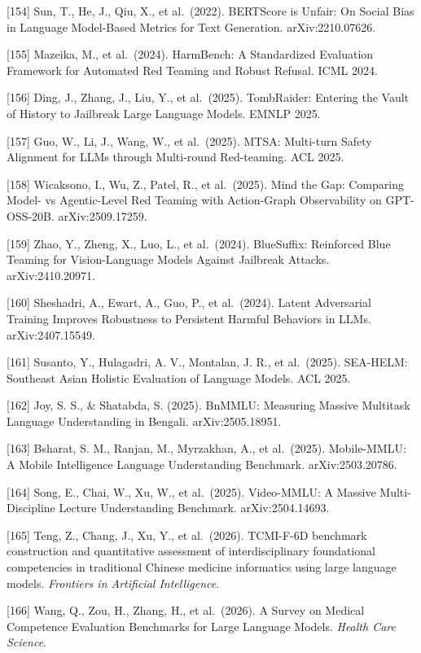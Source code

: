 {[}154{]} Sun, T., He, J., Qiu, X., et al.~(2022). BERTScore is Unfair: On Social Bias in Language Model-Based Metrics for Text Generation. arXiv:2210.07626.

{[}155{]} Mazeika, M., et al.~(2024). HarmBench: A Standardized Evaluation Framework for Automated Red Teaming and Robust Refusal. ICML 2024.

{[}156{]} Ding, J., Zhang, J., Liu, Y., et al.~(2025). TombRaider: Entering the Vault of History to Jailbreak Large Language Models. EMNLP 2025.

{[}157{]} Guo, W., Li, J., Wang, W., et al.~(2025). MTSA: Multi-turn Safety Alignment for LLMs through Multi-round Red-teaming. ACL 2025.

{[}158{]} Wicaksono, I., Wu, Z., Patel, R., et al.~(2025). Mind the Gap: Comparing Model- vs Agentic-Level Red Teaming with Action-Graph Observability on GPT-OSS-20B. arXiv:2509.17259.

{[}159{]} Zhao, Y., Zheng, X., Luo, L., et al.~(2024). BlueSuffix: Reinforced Blue Teaming for Vision-Language Models Against Jailbreak Attacks. arXiv:2410.20971.

{[}160{]} Sheshadri, A., Ewart, A., Guo, P., et al.~(2024). Latent Adversarial Training Improves Robustness to Persistent Harmful Behaviors in LLMs. arXiv:2407.15549.

{[}161{]} Susanto, Y., Hulagadri, A. V., Montalan, J. R., et al.~(2025). SEA-HELM: Southeast Asian Holistic Evaluation of Language Models. ACL 2025.

{[}162{]} Joy, S. S., \& Shatabda, S. (2025). BnMMLU: Measuring Massive Multitask Language Understanding in Bengali. arXiv:2505.18951.

{[}163{]} Bsharat, S. M., Ranjan, M., Myrzakhan, A., et al.~(2025). Mobile-MMLU: A Mobile Intelligence Language Understanding Benchmark. arXiv:2503.20786.

{[}164{]} Song, E., Chai, W., Xu, W., et al.~(2025). Video-MMLU: A Massive Multi-Discipline Lecture Understanding Benchmark. arXiv:2504.14693.

{[}165{]} Teng, Z., Chang, J., Xu, Y., et al.~(2026). TCMI-F-6D benchmark construction and quantitative assessment of interdisciplinary foundational competencies in traditional Chinese medicine informatics using large language models. \emph{Frontiers in Artificial Intelligence}.

{[}166{]} Wang, Q., Zou, H., Zhang, H., et al.~(2026). A Survey on Medical Competence Evaluation Benchmarks for Large Language Models. \emph{Health Care Science}.

